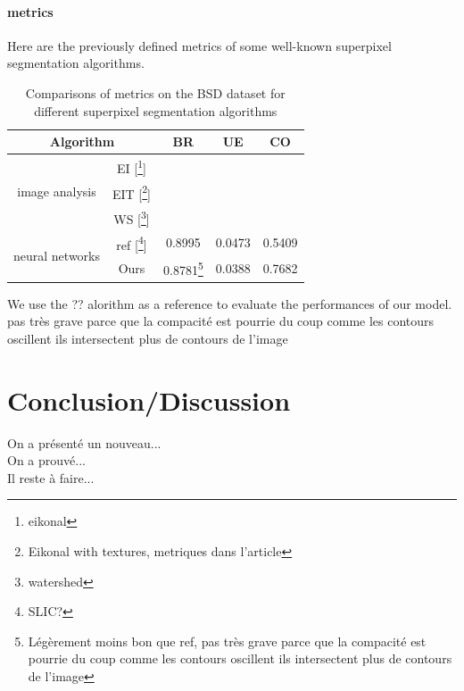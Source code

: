 \documentclass{article}
\begin{document}
            \paragraph{metrics}
            Here are the previously defined metrics of some well-known superpixel segmentation algorithms.
            \begin{table}[!ht]
                \centering
                \begin{tabular}{|c|c|ccc|}
                    \hline
                    \multicolumn{2}{|c|}{Algorithm} & BR & UE & CO\\
                    \hline
                    \hline
                    \multirow{3}{*}{image analysis} & EI [\footnote{eikonal}] & & & \\
                    & EIT [\footnote{Eikonal with textures, metriques dans l'article}] & & & \\
                    & WS [\footnote{watershed}] & & & \\
                    \hline
                    \multirow{2}{*}{neural networks} & ref [\footnote{SLIC?}] & 0.8995 & 0.0473 & 0.5409\\
                    & Ours & 0.8781\footnote{Légèrement moins bon que ref, pas très grave parce que la compacité est pourrie du coup comme les contours oscillent ils intersectent plus de contours de l'image} & 0.0388 & 0.7682\\
                    \hline
                \end{tabular}
                \caption{Comparisons of metrics on the BSD dataset for different
                superpixel segmentation algorithms}
            \end{table}

            \noindent We use the ?? alorithm as a reference to evaluate the performances of our model.
            pas très grave parce que la compacité est pourrie
            du coup comme les contours oscillent ils intersectent plus de contours de l'image








\section{Conclusion/Discussion}
On a présenté un nouveau...\\
On a prouvé...\\
Il reste à faire...
\end{document}
